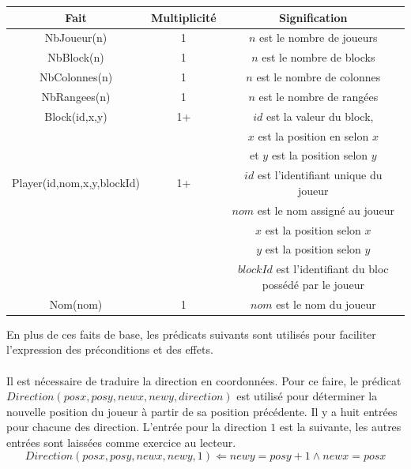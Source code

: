 \documentclass[12pt,english,frenchb,letterpaper]{article}
\begin{document}
\begin{center}
  \begin{tabular}{@{} ccc @{}}
    \hline
    Fait & Multiplicité & Signification \\ 
    \hline
    NbJoueur(n) & 1 & $n$ est le nombre de joueurs \\ 
    NbBlock(n) & 1 & $n$ est le nombre de blocks \\ 
    NbColonnes(n) & 1 & $n$ est le nombre de colonnes \\ 
    NbRangees(n) & 1 & $n$ est le nombre de rangées \\ 
    Block(id,x,y) & 1+ & $id$ est la valeur du block, \\
                                  && $x$ est la position en selon $x$ \\
                                  && et $y$ est la position selon $y$ \\ 
    Player(id,nom,x,y,blockId) & 1+ & $id$ est l'identifiant unique du joueur \\
                                                              && $nom$ est le nom assigné au joueur \\ 
                                                              && $x$ est la position selon $x$ \\
                                                              && $y$ est la position selon $y$ \\
                                                              && $blockId$ est l'identifiant du bloc possédé par le joueur\\
    Nom(nom) & 1 & $nom$ est le nom du joueur \\ 
    \hline
  \end{tabular}
\end{center}

En plus de ces faits de base, les prédicats suivants sont utilisés pour faciliter l'expression des préconditions et des effets. \\
\\
Il est nécessaire de traduire la direction en coordonnées. Pour ce faire, le prédicat $Direction(posx,posy,newx,newy,direction)$ est utilisé pour déterminer la nouvelle position du joueur à partir de sa position précédente.  Il y a huit entrées pour chacune des direction.  L'entrée pour la direction $1$ est la suivante, les autres entrées sont laissées comme exercice au lecteur.
\begin{equation*}
	Direction(posx,posy,newx,newy, 1) \Leftarrow newy = posy + 1 \wedge newx = posx 
\end{equation*}
\end{document}

